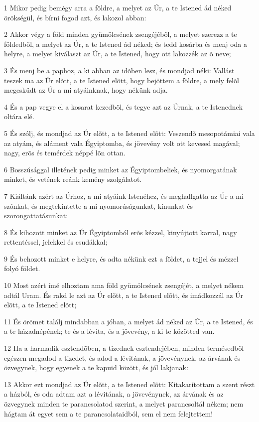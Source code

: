 \par 1 Mikor pedig bemégy arra a földre, a melyet az Úr, a te Istened ád néked örökségül, és bírni fogod azt, és lakozol abban:
\par 2 Akkor végy a föld minden gyümölcsének zsengéjébõl, a melyet szerezz a te földedbõl, a melyet az Úr, a te Istened ád néked; és tedd kosárba és menj oda a helyre, a melyet kiválaszt az Úr, a te Istened, hogy ott lakozzék az õ neve;
\par 3 És menj be a paphoz, a ki abban az idõben lesz, és mondjad néki: Vallást teszek ma az Úr elõtt, a te Istened elõtt, hogy bejöttem a földre, a mely felõl megesküdt az Úr a mi atyáinknak, hogy nékünk adja.
\par 4 És a pap vegye el a kosarat kezedbõl, és tegye azt az Úrnak, a te Istenednek oltára elé.
\par 5 És szólj, és mondjad az Úr elõtt, a te Istened elõtt: Veszendõ mesopotámiai vala az atyám, és aláment vala Égyiptomba, és jövevény volt ott kevesed magával; nagy, erõs és temérdek néppé lõn ottan.
\par 6 Bosszúsággal illetének pedig minket az Égyiptombeliek, és nyomorgatának minket, és vetének reánk kemény szolgálatot.
\par 7 Kiáltánk azért az Úrhoz, a mi atyáink Istenéhez, és meghallgatta az Úr a mi szónkat, és megtekintette a mi nyomorúságunkat, kínunkat és szorongattatásunkat:
\par 8 És kihozott minket az Úr Égyiptomból erõs kézzel, kinyújtott karral, nagy rettentéssel, jelekkel és csudákkal;
\par 9 És behozott minket e helyre, és adta nékünk ezt a földet, a tejjel és mézzel folyó földet.
\par 10 Most azért ímé elhoztam ama föld gyümölcsének zsengéjét, a melyet nékem adtál Uram. És rakd le azt az Úr elõtt, a te Istened elõtt, és imádkozzál az Úr elõtt, a te Istened elõtt;
\par 11 És örömet találj mindabban a jóban, a melyet ád néked az Úr, a te Istened, és a te házadnépének; te és a lévita, és a jövevény, a ki te közötted van.
\par 12 Ha a harmadik esztendõben, a tizednek esztendejében, minden termésedbõl egészen megadod a tizedet, és adod a lévitának, a jövevénynek, az árvának és özvegynek, hogy egyenek a te kapuid között, és jól lakjanak:
\par 13 Akkor ezt mondjad az Úr elõtt, a te Istened elõtt: Kitakarítottam a szent részt a házból, és oda adtam azt a lévitának, a jövevénynek, az árvának és az özvegynek minden te parancsolatod szerint, a melyet parancsoltál nékem; nem hágtam át egyet sem a te parancsolataidból, sem el nem felejtettem!
